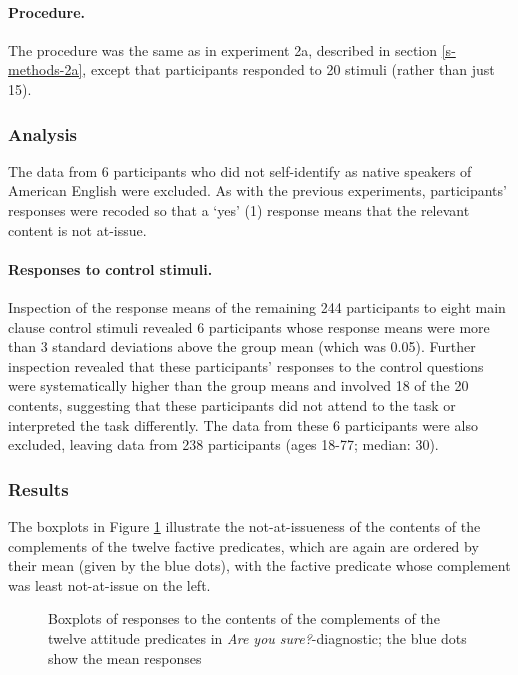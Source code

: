 \documentclass[11pt,fleqn]{article}
\newcommand{\6}{\mbox{$[\hspace*{-.6mm}[$}}
\newcommand{\9}{\mbox{$]\hspace*{-.6mm}]$}}
\begin{document}
\paragraph{Procedure.} The procedure was the same as in experiment 2a, described in section \ref{s-methods-2a}, except that participants responded to 20 stimuli (rather than just 15).

\subsubsection{Analysis}

The data from 6 participants who did not self-identify as native speakers of American English were excluded. As with the previous experiments, participants' responses were recoded so that a `yes' (1) response means that the relevant content is not at-issue.

\paragraph{Responses to control stimuli.} 
Inspection of the response means of the remaining 244 participants to eight main clause control stimuli revealed 6 participants whose response means were more than 3 standard deviations above the group mean (which was 0.05). Further inspection revealed that these participants' responses to the control questions were systematically higher than the group means and involved 18 of the 20 contents, suggesting that these participants did not attend to the task or interpreted the task differently. The data from these 6 participants were also excluded, leaving data from 238 participants (ages 18-77; median: 30). 

\subsubsection{Results}

The boxplots in Figure \ref{f-exp2b} illustrate the not-at-issueness of the contents of the complements of the twelve factive predicates, which are again are ordered by their mean (given by the blue dots), with the factive predicate whose complement was least not-at-issue on the left.

\begin{figure}[!h]

\begin{center}

\end{center}

\caption{Boxplots of responses to the contents of the complements of the twelve attitude predicates in {\em Are you sure?}-diagnostic; the blue dots show the mean responses}\label{f-exp2b}
\end{figure}
\end{document}
